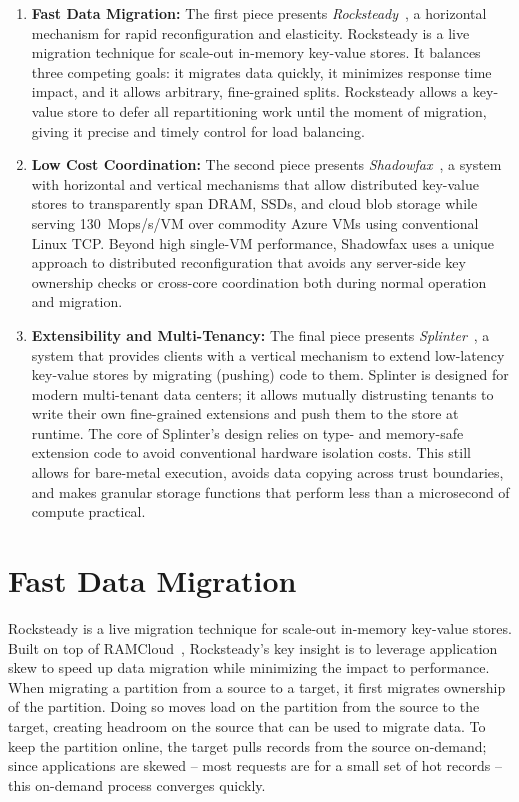\begin{enumerate}
\item \textbf{Fast Data Migration:}
The first piece presents \emph{Rocksteady}~\cite{rocksteady},
a horizontal mechanism for rapid reconfiguration and elasticity.
%
Rocksteady is a live migration technique for scale-out
in-memory key-value stores.
%
It balances three competing goals: it
migrates data quickly, it minimizes response time impact, and it
allows arbitrary, fine-grained splits.
%
Rocksteady allows a key-value store to defer all repartitioning work
until the moment of migration, giving it precise and timely control for
load balancing.

\item \textbf{Low Cost Coordination:}
The second piece presents \emph{Shadowfax}~\cite{shadowfax},
a system with horizontal and vertical mechanisms that
allow distributed key-value stores to
transparently span DRAM, SSDs, and cloud blob storage while serving
130~Mops/s/VM over commodity Azure VMs using conventional Linux TCP.
%
Beyond
high single-VM performance, Shadowfax uses a unique approach to distributed
reconfiguration that avoids any server-side key ownership checks
or cross-core coordination both during normal operation and migration.

\item \textbf{Extensibility and Multi-Tenancy:}
The final piece presents \emph{Splinter}~\cite{splinter}, a system that
provides clients with a vertical mechanism
to extend low-latency key-value stores by migrating (pushing) code to them.
%
Splinter is designed for
modern multi-tenant data centers; it allows mutually distrusting tenants to write
their own fine-grained extensions and push
them to the store at runtime.
%
The core of
Splinter's design relies on type- and memory-safe
extension code to avoid conventional hardware isolation costs.
%
This
still allows for bare-metal execution, avoids data copying across trust
boundaries, and makes granular storage functions that perform less than
a microsecond of compute practical.

\end{enumerate}

\section{Fast Data Migration}

Rocksteady is a live migration technique for scale-out
in-memory key-value stores.
%
Built on top of RAMCloud~\cite{ramcloud}, Rocksteady’s key insight is to
leverage application skew to speed up data migration while minimizing
the impact to performance.
%
When migrating a partition from a source to a target, it first migrates
ownership of the partition.
%
Doing so moves load on the partition from the source to the target, creating
headroom on the source that can be used to migrate data.
%
To keep the partition online, the target pulls records from the source
on-demand; since applications are skewed – most requests are for a small
set of hot records – this on-demand process converges quickly.

